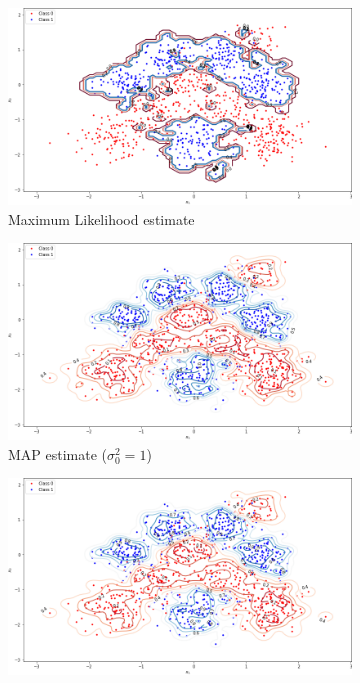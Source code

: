 \documentclass[a4paper]{article}
\begin{document}
    \begin{figure}[h]
        \begin{subfigure}{0.33\textwidth}
            \centering
            \includegraphics[width=\textwidth]{plots/bayesian_logistic_classification/predictive_distribution_ML_width_0.1}
            \caption{Maximum Likelihood estimate}
            \label{fig:predictive-distribution-ml-width-0.1}
        \end{subfigure}
        \begin{subfigure}{0.33\textwidth}
            \centering
            \includegraphics[width=\textwidth]{plots/bayesian_logistic_classification/predictive_distribution_MAP_width_0.1_prior_variance_1}
            \caption{MAP estimate ($\sigma_0^2=1$)}
            \label{fig:predictive-distribution-map-width-0.1}
        \end{subfigure}
        \begin{subfigure}{0.33\textwidth}
            \centering
            \includegraphics[width=\textwidth]{plots/bayesian_logistic_classification/predictive_distribution_laplace_width_0.1_prior_variance_1}

\end{subfigure}
\end{figure}
\end{document}
